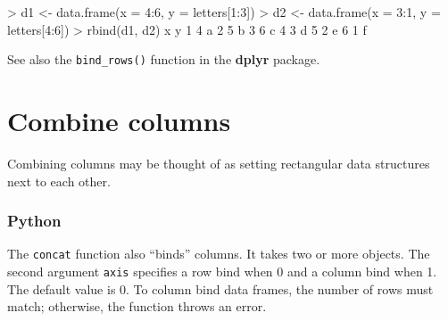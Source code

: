 \documentclass[
]{book}
\newenvironment{Shaded}{\begin{snugshade}}{\end{snugshade}}
\newcommand{\AttributeTok}[1]{\textcolor[rgb]{0.77,0.63,0.00}{#1}}
\newcommand{\DecValTok}[1]{\textcolor[rgb]{0.00,0.00,0.81}{#1}}
\newcommand{\FunctionTok}[1]{\textcolor[rgb]{0.00,0.00,0.00}{#1}}
\newcommand{\NormalTok}[1]{#1}
\newcommand{\OtherTok}[1]{\textcolor[rgb]{0.56,0.35,0.01}{#1}}
\newcommand{\SpecialCharTok}[1]{\textcolor[rgb]{0.00,0.00,0.00}{#1}}
\begin{document}
\begin{Shaded}
\begin{Highlighting}[]
\SpecialCharTok{\textgreater{}}\NormalTok{ d1 }\OtherTok{\textless{}{-}} \FunctionTok{data.frame}\NormalTok{(}\AttributeTok{x =} \DecValTok{4}\SpecialCharTok{:}\DecValTok{6}\NormalTok{, }\AttributeTok{y =}\NormalTok{ letters[}\DecValTok{1}\SpecialCharTok{:}\DecValTok{3}\NormalTok{])}
\SpecialCharTok{\textgreater{}}\NormalTok{ d2 }\OtherTok{\textless{}{-}} \FunctionTok{data.frame}\NormalTok{(}\AttributeTok{x =} \DecValTok{3}\SpecialCharTok{:}\DecValTok{1}\NormalTok{, }\AttributeTok{y =}\NormalTok{ letters[}\DecValTok{4}\SpecialCharTok{:}\DecValTok{6}\NormalTok{])}
\SpecialCharTok{\textgreater{}} \FunctionTok{rbind}\NormalTok{(d1, d2)}
\NormalTok{  x y}
\DecValTok{1} \DecValTok{4}\NormalTok{ a}
\DecValTok{2} \DecValTok{5}\NormalTok{ b}
\DecValTok{3} \DecValTok{6}\NormalTok{ c}
\DecValTok{4} \DecValTok{3}\NormalTok{ d}
\DecValTok{5} \DecValTok{2}\NormalTok{ e}
\DecValTok{6} \DecValTok{1}\NormalTok{ f}
\end{Highlighting}
\end{Shaded}

See also the \texttt{bind\_rows()} function in the \textbf{dplyr} package.

\hypertarget{combine-columns}{%
\section{Combine columns}\label{combine-columns}}

Combining columns may be thought of as setting rectangular data structures next to each other.

\hypertarget{python-31}{%
\subsubsection*{Python}\label{python-31}}

The \texttt{concat} function also ``binds'' columns. It takes two or more objects. The second argument \texttt{axis} specifies a row bind when 0 and a column bind when 1. The default value is 0. To column bind data frames, the number of rows must match; otherwise, the function throws an error.
\end{document}
